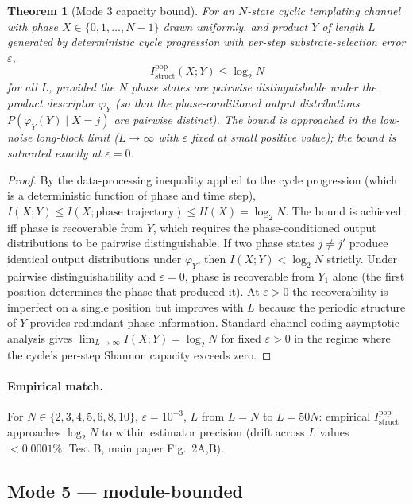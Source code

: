\documentclass[11pt]{article}
\theoremstyle{plain}
\newtheorem{theorem}{Theorem}
\theoremstyle{definition}
\newcommand{\Istructpop}{I_{\mathrm{struct}}^{\mathrm{pop}}}
\newcommand{\descY}{\varphi_Y}
\begin{document}
\begin{theorem}[Mode 3 capacity bound]
\label{thm:mode3}
For an $N$-state cyclic templating channel with phase $X \in \{0, 1, \ldots, N-1\}$ drawn uniformly, and product $Y$ of length $L$ generated by deterministic cycle progression with per-step substrate-selection error $\varepsilon$,
\[
\Istructpop(X; Y) \le \log_2 N
\]
for all $L$, provided the $N$ phase states are pairwise distinguishable under the product descriptor $\descY$ (so that the phase-conditioned output distributions $P(\descY(Y) \mid X = j)$ are pairwise distinct). The bound is approached in the low-noise long-block limit ($L \to \infty$ with $\varepsilon$ fixed at small positive value); the bound is saturated exactly at $\varepsilon = 0$.
\end{theorem}

\begin{proof}
By the data-processing inequality applied to the cycle progression (which is a deterministic function of phase and time step), $I(X; Y) \le I(X; \text{phase trajectory}) \le H(X) = \log_2 N$. The bound is achieved iff phase is recoverable from $Y$, which requires the phase-conditioned output distributions to be pairwise distinguishable. If two phase states $j \ne j'$ produce identical output distributions under $\descY$, then $I(X; Y) < \log_2 N$ strictly. Under pairwise distinguishability and $\varepsilon = 0$, phase is recoverable from $Y_1$ alone (the first position determines the phase that produced it). At $\varepsilon > 0$ the recoverability is imperfect on a single position but improves with $L$ because the periodic structure of $Y$ provides redundant phase information. Standard channel-coding asymptotic analysis \citep[Theorem 8.7.1]{CoverThomas2006} gives $\lim_{L \to \infty} I(X; Y) = \log_2 N$ for fixed $\varepsilon > 0$ in the regime where the cycle's per-step Shannon capacity exceeds zero.
\end{proof}

\paragraph{Empirical match.} For $N \in \{2, 3, 4, 5, 6, 8, 10\}$, $\varepsilon = 10^{-3}$, $L$ from $L = N$ to $L = 50N$: empirical $\Istructpop$ approaches $\log_2 N$ to within estimator precision (drift across $L$ values $< 0.0001\%$; Test B, main paper Fig.~2A,B).

\subsection{Mode 5 --- module-bounded}
\end{document}
